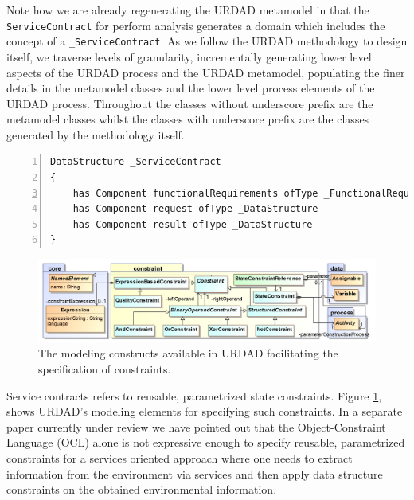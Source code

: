 \begin{itemize}
\begin{itemize}
Note how we are already regenerating the URDAD metamodel in that the \verb+ServiceContract+ for perform analysis generates a domain which includes the concept of a \verb+_ServiceContract+. As we follow the URDAD methodology to design itself, we traverse levels of granularity, incrementally generating lower level aspects of the URDAD process and the URDAD metamodel, populating the finer details in the metamodel classes and the lower level process elements of the URDAD process. Throughout the classes without underscore prefix are the metamodel classes whilst the classes with underscore prefix are the classes generated by the methodology itself. 

\lstset{language=urdad,caption=Regenerated metamodel classes.,label=constraintTextSyntax}
\begin{lstlisting}[numbers=left,escapechar=|]
DataStructure _ServiceContract 
{
    has Component functionalRequirements ofType _FunctionalRequirements
    has Component request ofType _DataStructure
    has Component result ofType _DataStructure
}
\end{lstlisting}

\begin{figure}[Htbp]
  \centering
  \includegraphics{constraint}
  \caption{The modeling constructs available in URDAD facilitating the specification of constraints.}
  \label{fig:constraintModule}
\end{figure}

Service contracts refers to reusable, parametrized state constraints. Figure \ref{fig:constraintModule}, shows URDAD's modeling elements for specifying such constraints. In a separate paper currently under review we have pointed out that the Object-Constraint Language (OCL)\cite{_object_2010}  alone is not expressive enough to specify reusable, parametrized constraints for a services oriented approach where one needs to extract information from the environment via services and then apply data structure constraints on the obtained environmental information.


\end{itemize}
\end{itemize}

